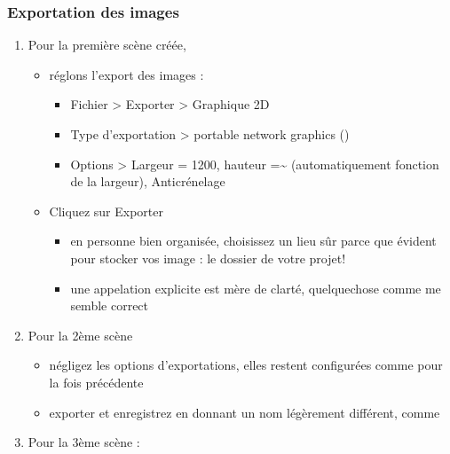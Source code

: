 \documentclass[a4paper,12pt,french]{sphinxmanual}
\begin{document}
\subsubsection{Exportation des images}
\label{psd/prepa-image_su+psd:exportation-des-images}\begin{enumerate}
\item {} 
Pour la première scène créée,
\begin{itemize}
\item {} 
réglons l'export des images :
\begin{itemize}
\item {} 
Fichier \textgreater{} Exporter \textgreater{} Graphique 2D

\item {} 
Type d'exportation \textgreater{} portable network graphics ()

\item {} 
Options \textgreater{} Largeur = 1200, hauteur =\textasciitilde{} (automatiquement fonction de la largeur), Anticrénelage

\end{itemize}

\item {} 
Cliquez sur Exporter
\begin{itemize}
\item {} 
en personne bien organisée, choisissez un lieu sûr parce que évident pour stocker vos image : le dossier  de votre projet!

\item {} 
une appelation explicite est mère de clarté, quelquechose comme  me semble correct

\end{itemize}

\end{itemize}

\item {} 
Pour la 2ème scène
\begin{itemize}
\item {} 
négligez les options d'exportations, elles restent configurées comme pour la fois précédente

\item {} 
exporter et enregistrez en donnant un nom légèrement différent, comme 

\end{itemize}

\item {} 
Pour la 3ème scène : 

\end{enumerate}
\end{document}

